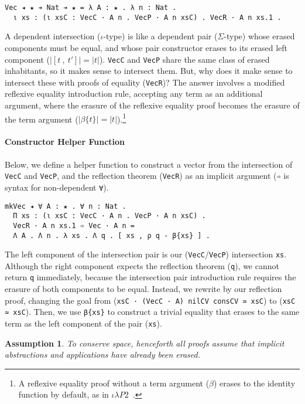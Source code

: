 \documentclass[a4paper,envcountsame,envcountsect]{llncs}
\newtheorem{assumption}{Assumption}
\newcommand{\labasm}[1]{\label{asm:#1}}
\newcommand{\cdle}[0]{\ensuremath{\iota \lambda P2}~}
\newcommand{\erase}[1]{\ensuremath{\lvert #1 \rvert}}
\newcommand{\pair}[2]{\ensuremath{[ #1 ~,~ #2]}}
\newcommand{\refl}[1]{\ensuremath{\beta\{#1\}}}
\begin{document}
\begin{verbatim}
Vec ◂ ★ ➔ Nat ➔ ★ = λ A : ★ . λ n : Nat .
  ι xs : (ι xsC : VecC · A n . VecP · A n xsC) . VecR · A n xs.1 .
\end{verbatim}

A dependent intersection ($\iota$-type)
is like a dependent pair ($\Sigma$-type) whose erased components must be equal, and
whose pair constructor erases to its erased left component
($\erase{\pair{t}{t'}} = \erase{t}$).
\texttt{VecC} and \texttt{VecP} share the same class of erased inhabitants, so it
makes sense to intersect them. But, why does it make sense to
intersect these with proofs of equality (\texttt{VecR})?
The answer involves a modified reflexive equality introduction rule,
accepting any term as an additional argument, where the erasure of the
reflexive equality proof becomes the erasure of the term argument
($\erase{\refl{t}} = \erase{t}$).\footnote{A reflexive equality proof
  without a term argument ($\beta$) erases to the identity function by
  default, as in \cdle\cite{stump17b}.
  }

\paragraph{Constructor Helper Function}

Below, we define a helper function to construct a vector from the
intersection of \texttt{VecC} and \texttt{VecP}, and the reflection
theorem (\texttt{VecR}) as an implicit argument (\texttt{➾} is syntax
for non-dependent \texttt{∀}).

\begin{verbatim}
mkVec ◂ ∀ A : ★ . ∀ n : Nat .
  Π xs : (ι xsC : VecC · A n . VecP · A n xsC) .
  VecR · A n xs.1 ➾ Vec · A n =
  Λ A . Λ n . λ xs . Λ q . [ xs , ρ q - β{xs} ] .
\end{verbatim}

The left component of the intersection pair is our
(\texttt{VecC}/\texttt{VecP}) intersection
\texttt{xs}. Although the right component expects the reflection
theorem (\texttt{q}), we cannot return \texttt{q} immediately, because
the intersection pair introduction rule requires the erasure of both
components to be equal. Instead, we rewrite by our reflection proof,
changing the goal from (\texttt{xsC · (VecC · A) nilCV consCV ≃ xsC})
to (\texttt{xsC ≃ xsC}). Then, we use \texttt{β\{xs\}} to construct
a trivial equality that erases to the same term as the left component
of the pair (\texttt{xs}).

\begin{assumption}
  To conserve space, henceforth all proofs assume that implicit
  abstractions and applications have already been erased.
\labasm{eraseimp}
\end{assumption}
\end{document}
